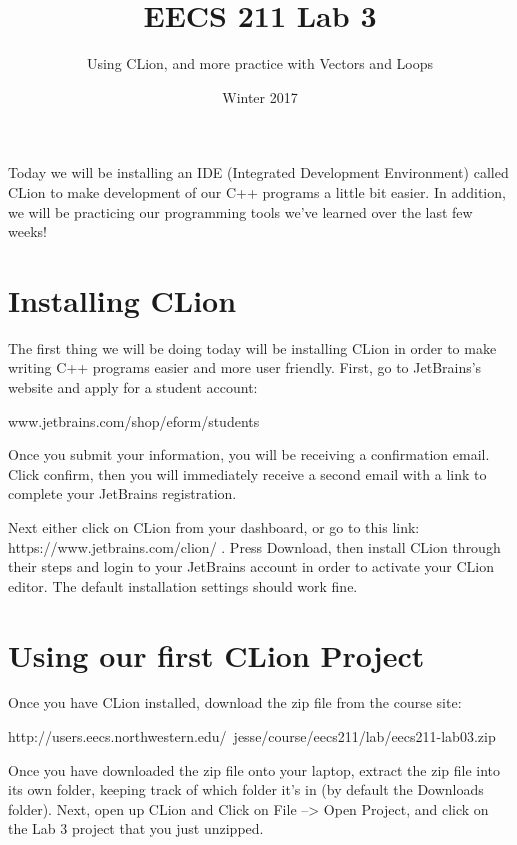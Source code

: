 \documentclass{tufte-handout}
\title{EECS 211 Lab 3}
\author{Using CLion, and more practice with Vectors and Loops}
\date{Winter 2017}
\begin{document}
\maketitle

Today we will be installing an IDE (Integrated Development Environment) called CLion to make development of our C++ programs a little bit easier.  In addition, we will be practicing our programming tools we've learned over the last few weeks!

\section{Installing CLion}
The first thing we will be doing today will be installing CLion in order to make writing C++ programs easier and more user friendly.  First, go to JetBrains's website and apply for a student account: \newline

www.jetbrains.com/shop/eform/students \newline

Once you submit your information, you will be receiving a confirmation email.  Click confirm, then you will immediately receive a second email with a link to complete your JetBrains registration.

Next either click on CLion from your dashboard, or go to this link: https://www.jetbrains.com/clion/ .  Press Download, then install CLion through their steps and login to your JetBrains account in order to activate your CLion editor. The default installation settings should work fine.   



\section{Using our first CLion Project}
Once you have CLion installed, download the zip file from the course site:

http://users.eecs.northwestern.edu/~jesse/course/eecs211/lab/eecs211-lab03.zip

Once you have downloaded the zip file onto your laptop, extract the zip file into its own folder, keeping track of which folder it's in (by default the Downloads folder).  Next, open up CLion and Click on File --> Open Project, and click on the Lab 3 project that you just unzipped. 
\end{document}
